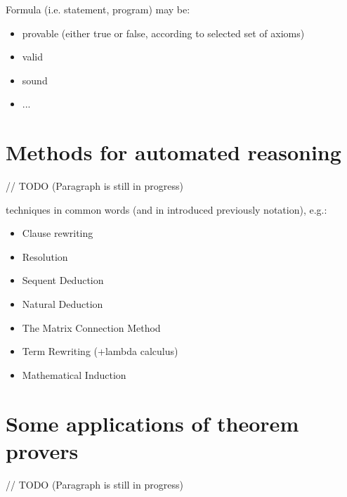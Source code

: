 \documentclass[article]{aaltoseries}
\begin{document}
Formula (i.e. statement, program) may be:
\begin{itemize}
\itemsep0em
	\item provable (either true or false, according to selected set of axioms)
	\item valid
	\item sound
	\item ...
\end{itemize}


\section{Methods for automated reasoning}
\label{sec:auto_reasoning}

// TODO (Paragraph is still in progress)

techniques in common words (and in introduced previously notation), e.g.: 
\begin{itemize}
\itemsep0em
	\item Clause rewriting
	\item Resolution
	\item Sequent Deduction
	\item Natural Deduction
	\item The Matrix Connection Method
	\item Term Rewriting (+lambda calculus)
	\item Mathematical Induction
\end{itemize}




\section{Some applications of theorem provers}
\label{sec:applications}

// TODO (Paragraph is still in progress) 
\end{document}
